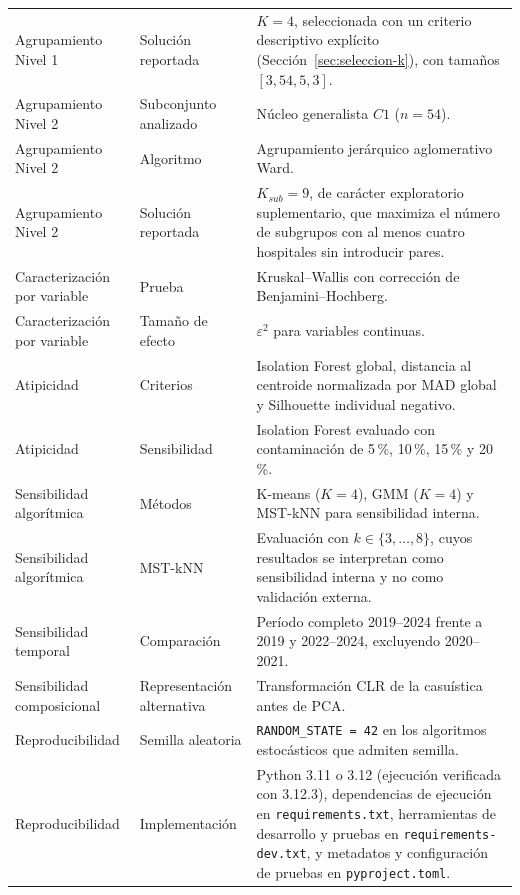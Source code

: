 \begin{longtable}{p{3.6cm} p{4.3cm} p{5.8cm}}
Agrupamiento Nivel 1 &
Solución reportada &
$K=4$, seleccionada con un criterio descriptivo explícito (Sección~\ref{sec:seleccion-k}), con tamaños
$[3,54,5,3]$. \\

Agrupamiento Nivel 2 &
Subconjunto analizado &
Núcleo generalista $C1$ ($n=54$). \\

Agrupamiento Nivel 2 &
Algoritmo &
Agrupamiento jerárquico aglomerativo Ward. \\

Agrupamiento Nivel 2 &
Solución reportada &
$K_{sub}=9$, de carácter exploratorio suplementario, que maximiza el número de
subgrupos con al menos cuatro hospitales sin introducir pares. \\

Caracterización por variable &
Prueba &
Kruskal--Wallis con corrección de Benjamini--Hochberg. \\

Caracterización por variable &
Tamaño de efecto &
$\varepsilon^2$ para variables continuas. \\

Atipicidad &
Criterios &
Isolation Forest global, distancia al centroide normalizada por MAD global y Silhouette individual negativo. \\

Atipicidad &
Sensibilidad &
Isolation Forest evaluado con contaminación de 5\,\%, 10\,\%, 15\,\% y 20\,\%. \\

Sensibilidad algorítmica &
Métodos &
K-means ($K=4$), GMM ($K=4$) y MST-kNN para sensibilidad interna. \\

Sensibilidad algorítmica &
MST-kNN &
Evaluación con $k \in \{3,\ldots,8\}$, cuyos resultados se interpretan como sensibilidad interna y no como validación externa. \\

Sensibilidad temporal &
Comparación &
Período completo 2019--2024 frente a 2019 y 2022--2024, excluyendo 2020--2021. \\

Sensibilidad composicional &
Representación alternativa &
Transformación CLR de la casuística antes de PCA. \\

Reproducibilidad &
Semilla aleatoria &
\texttt{RANDOM\_STATE = 42} en los algoritmos estocásticos que admiten semilla. \\

Reproducibilidad &
Implementación &
Python 3.11 o 3.12 (ejecución verificada con 3.12.3), dependencias de ejecución en \texttt{requirements.txt}, herramientas de desarrollo y pruebas en \texttt{requirements-dev.txt}, y metadatos y configuración de pruebas en \texttt{pyproject.toml}. \\

\bottomrule
\end{longtable}

